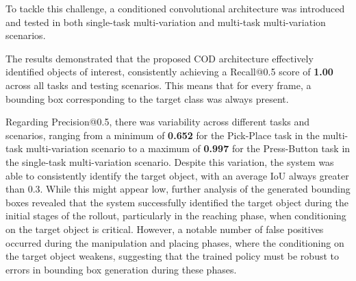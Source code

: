 To tackle this challenge, a conditioned convolutional architecture was introduced and tested in both single-task multi-variation and multi-task multi-variation scenarios.

The results demonstrated that the proposed COD architecture effectively identified objects of interest, consistently achieving a Recall@0.5 score of \textbf{1.00} across all tasks and testing scenarios. This means that for every frame, a bounding box corresponding to the target class was always present.

Regarding Precision@0.5, there was variability across different tasks and scenarios, ranging from a minimum of \textbf{0.652} for the Pick-Place task in the multi-task multi-variation scenario to a maximum of \textbf{0.997} for the Press-Button task in the single-task multi-variation scenario. Despite this variation, the system was able to consistently identify the target object, with an average IoU always greater than 0.3. While this might appear low, further analysis of the generated bounding boxes revealed that the system successfully identified the target object during the initial stages of the rollout, particularly in the reaching phase, when conditioning on the target object is critical. However, a notable number of false positives occurred during the manipulation and placing phases, where the conditioning on the target object weakens, suggesting that the trained policy must be robust to errors in bounding box generation during these phases.